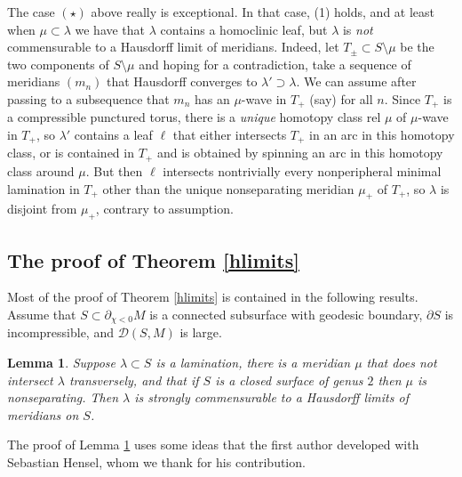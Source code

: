 \documentclass[12pt]{amsart}
\newtheorem{lemma}[theorem]{Lemma}
\theoremstyle{definition}
\theoremstyle{remark}
\begin{document}
The case $(\star)$ above really is exceptional. In that case, (1) holds, and at least when $\mu \subset \lambda$ we have that $\lambda$ contains a homoclinic leaf, but  $\lambda$ is \emph{not} commensurable to a Hausdorff limit of meridians. Indeed, let $T_\pm\subset S \setminus \mu$  be the two components of $S \setminus \mu$ and hoping for a contradiction, take a sequence of meridians $(m_n)$ that Hausdorff converges to $\lambda'\supset \lambda$. We can assume after passing to a subsequence that $m_n$ has an $\mu$-wave in $T_+$ (say) for all $n$. Since $T_+$ is a compressible punctured torus, there is a \emph{unique} homotopy class rel $\mu$ of $\mu$-wave in $T_+$, so $\lambda'$ contains a leaf $\ell$ that either intersects $T_+$ in an arc in this homotopy class, or is contained in $T_+$ and is obtained by spinning an arc in this homotopy class around $\mu$. But then $\ell$ intersects nontrivially every nonperipheral minimal lamination in $T_+$ other than the unique nonseparating meridian $\mu_+$ of $T_+$, so $\lambda$ is disjoint from $\mu_+$, contrary to assumption.



\subsection{The proof of Theorem \ref{hlimits}}

Most of the proof of Theorem \ref{hlimits} is contained in the following results. Assume that $S\subset \partial_{\chi<0} M$ is a connected subsurface with geodesic boundary, $\partial S$ is incompressible, and $\mathcal D(S,M)$ is large.



\begin{lemma}\label{promotinghlimitslem}
Suppose $\lambda \subset S$ is a lamination, there is a meridian $\mu$ that does not intersect $\lambda$ transversely, and that if $S$ is a closed surface of genus $2$ then $\mu$ is nonseparating. Then $\lambda$ is strongly commensurable to a Hausdorff limits of meridians on $S$.
\end{lemma}

The proof of Lemma \ref{promotinghlimitslem} uses some ideas that the first author developed with Sebastian Hensel, whom we thank for his contribution.
\end{document}
